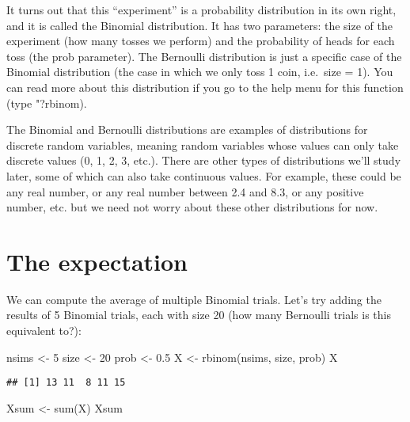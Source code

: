 \documentclass[
]{book}
\newenvironment{Shaded}{\begin{snugshade}}{\end{snugshade}}
\newcommand{\DecValTok}[1]{\textcolor[rgb]{0.00,0.00,0.81}{#1}}
\newcommand{\FloatTok}[1]{\textcolor[rgb]{0.00,0.00,0.81}{#1}}
\newcommand{\FunctionTok}[1]{\textcolor[rgb]{0.00,0.00,0.00}{#1}}
\newcommand{\NormalTok}[1]{#1}
\newcommand{\OtherTok}[1]{\textcolor[rgb]{0.56,0.35,0.01}{#1}}
\begin{document}
It turns out that this ``experiment'' is a probability distribution in its own right, and it is called the Binomial distribution. It has two parameters: the size of the experiment (how many tosses we perform) and the probability of heads for each toss (the prob parameter). The Bernoulli distribution is just a specific case of the Binomial distribution (the case in which we only toss 1 coin, i.e.~size = 1). You can read more about this distribution if you go to the help menu for this function (type "?rbinom).

The Binomial and Bernoulli distributions are examples of distributions for discrete random variables, meaning random variables whose values can only take discrete values (0, 1, 2, 3, etc.). There are other types of distributions we'll study later, some of which can also take continuous values. For example, these could be any real number, or any real number between 2.4 and 8.3, or any positive number, etc. but we need not worry about these other distributions for now.

\hypertarget{the-expectation}{%
\section{The expectation}\label{the-expectation}}

We can compute the average of multiple Binomial trials. Let's try adding the results of 5 Binomial trials, each with size 20 (how many Bernoulli trials is this equivalent to?):

\begin{Shaded}
\begin{Highlighting}[]
\NormalTok{nsims }\OtherTok{\textless{}{-}} \DecValTok{5}
\NormalTok{size }\OtherTok{\textless{}{-}} \DecValTok{20}
\NormalTok{prob }\OtherTok{\textless{}{-}} \FloatTok{0.5}
\NormalTok{X }\OtherTok{\textless{}{-}} \FunctionTok{rbinom}\NormalTok{(nsims, size, prob)}
\NormalTok{X}
\end{Highlighting}
\end{Shaded}

\begin{verbatim}
## [1] 13 11  8 11 15
\end{verbatim}

\begin{Shaded}
\begin{Highlighting}[]
\NormalTok{Xsum }\OtherTok{\textless{}{-}} \FunctionTok{sum}\NormalTok{(X)}
\NormalTok{Xsum}
\end{Highlighting}
\end{Shaded}
\end{document}
